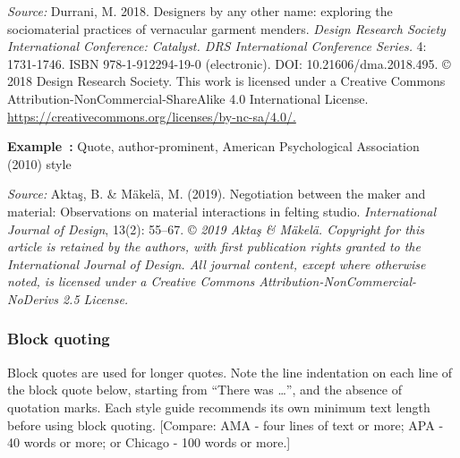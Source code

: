 \documentclass[english, 12pt, a4paper, elec, utf8, a-2b, online]{aaltothesis}
\begin{document}
\vspace{1ex}
\noindent
{}

\vspace{1ex}
\noindent
\textit{Source:} Durrani, M. 2018. Designers by any other name: exploring the 
sociomaterial practices of vernacular garment menders. \textit{Design Research 
Society International Conference: Catalyst. DRS International Conference 
Series.} 4: 1731-1746. ISBN 978-1-912294-19-0 (electronic). 
DOI: 10.21606/dma.2018.495. \copyright{} 2018 Design Research Society. This work
is licensed under a Creative Commons Attribution-NonCommercial-ShareAlike 4.0 
International License. \url{https://creativecommons.org/licenses/by-nc-sa/4.0/.}

\vspace{1em}
\noindent
{}
\textsf{\textbf{Example~\theexample:}} Quote, author-prominent, American 
Psychological Association (2010) style

\vspace{1ex}
\noindent
{}

\vspace{1ex}
\noindent
\textit{Source:} Aktaş, B. \& Mäkelä, M. (2019). Negotiation between the maker 
and material: Observations on material interactions in felting studio. 
\textit{International Journal of Design}, 13(2): 55--67. \copyright{} 
\textit{2019 Aktaş \& Mäkelä. Copyright for this article is retained by the 
	authors, with first publication rights granted to the International Journal 
	of Design. All journal content, except where otherwise noted, is licensed 
	under a Creative Commons Attribution-NonCommercial-NoDerivs 2.5 License.}


\subsubsection*{Block quoting}

Block quotes are used for longer quotes. Note the line indentation on each line 
of the block quote below, starting from “There was \ldots”, and the absence of 
quotation marks. Each style guide recommends its own minimum text length before 
using block quoting. [Compare: AMA - four lines of text or more; APA - 40 words 
or more; or Chicago - 100 words or more.]
\end{document}
